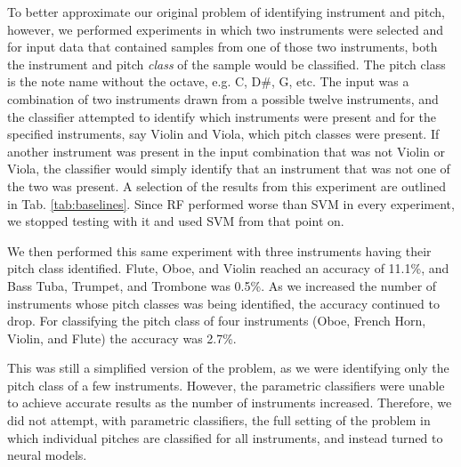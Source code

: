 \documentclass[runningheads,a4paper]{llncs}
\begin{document}
To better approximate our original problem of identifying instrument and pitch, however, we performed experiments in which two instruments were selected and for input data that contained samples from one of those two instruments, both the instrument and pitch \emph{class} of the sample would be classified. The pitch class is the note name without the octave, e.g. C, D\#, G, etc. The input was a combination of two instruments drawn from a possible twelve instruments, and the classifier attempted to identify which instruments were present and for the specified instruments, say Violin and Viola, which pitch classes were present. If another instrument was present in the input combination that was not Violin or Viola, the classifier would simply identify that an instrument that was not one of the two was present. A selection of the results from this experiment are outlined in Tab. \ref{tab:baselines}. Since RF performed worse than SVM in every experiment, we stopped testing with it and used SVM from that point on.

We then performed this same experiment with three instruments having their pitch class identified. Flute, Oboe, and Violin reached an accuracy of 11.1\%, and Bass Tuba, Trumpet, and Trombone was 0.5\%. As we increased the number of instruments whose pitch classes was being identified, the accuracy continued to drop. For classifying the pitch class of four instruments (Oboe, French Horn, Violin, and Flute) the accuracy was 2.7\%.

This was still a simplified version of the problem, as we were identifying only the pitch class of a few instruments. However, the parametric classifiers were unable to achieve accurate results as the number of instruments increased. Therefore, we did not attempt, with parametric classifiers, the full setting of the problem in which individual pitches are classified for all instruments, and instead turned to neural models.

\end{document}
